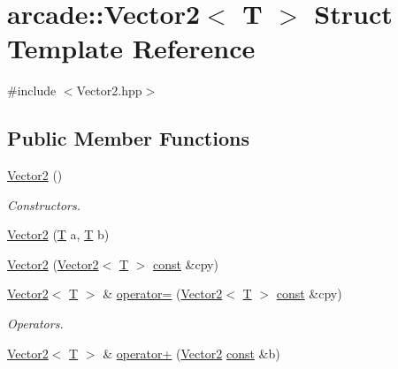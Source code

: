 \hypertarget{structarcade_1_1_vector2}{\section{arcade\-:\-:Vector2$<$ T $>$ Struct Template Reference}
\label{structarcade_1_1_vector2}
}


{\ttfamily \#include $<$Vector2.\-hpp$>$}

\subsection*{Public Member Functions}
\begin{DoxyCompactItemize}
\item 
\hyperlink{structarcade_1_1_vector2_ab6123858518f3e2d9a882c6214c44f85}{Vector2} ()
\begin{DoxyCompactList}\small\item\em Constructors. \end{DoxyCompactList}\item 
\hyperlink{structarcade_1_1_vector2_a4a28f8c0cfdf252ab8be10c4c458f89c}{Vector2} (\hyperlink{curses_8priv_8h_a5ef253115820acf7d27f3c5c3b02a0f0}{T} a, \hyperlink{curses_8priv_8h_a5ef253115820acf7d27f3c5c3b02a0f0}{T} b)
\item 
\hyperlink{structarcade_1_1_vector2_a68382e22f81a5fa2374dda464c249d6e}{Vector2} (\hyperlink{structarcade_1_1_vector2}{Vector2}$<$ \hyperlink{curses_8priv_8h_a5ef253115820acf7d27f3c5c3b02a0f0}{T} $>$ \hyperlink{term__entry_8h_a57bd63ce7f9a353488880e3de6692d5a}{const} \&cpy)
\item 
\hyperlink{structarcade_1_1_vector2}{Vector2}$<$ \hyperlink{curses_8priv_8h_a5ef253115820acf7d27f3c5c3b02a0f0}{T} $>$ \& \hyperlink{structarcade_1_1_vector2_a3a3dc7d16113960ce2effd5399821a57}{operator=} (\hyperlink{structarcade_1_1_vector2}{Vector2}$<$ \hyperlink{curses_8priv_8h_a5ef253115820acf7d27f3c5c3b02a0f0}{T} $>$ \hyperlink{term__entry_8h_a57bd63ce7f9a353488880e3de6692d5a}{const} \&cpy)
\begin{DoxyCompactList}\small\item\em Operators. \end{DoxyCompactList}\item 
\hyperlink{structarcade_1_1_vector2}{Vector2}$<$ \hyperlink{curses_8priv_8h_a5ef253115820acf7d27f3c5c3b02a0f0}{T} $>$ \& \hyperlink{structarcade_1_1_vector2_a12cbd7682400433ae15ba2d90f7bc3c2}{operator+} (\hyperlink{structarcade_1_1_vector2}{Vector2} \hyperlink{term__entry_8h_a57bd63ce7f9a353488880e3de6692d5a}{const} \&b)

\end{DoxyCompactItemize}
